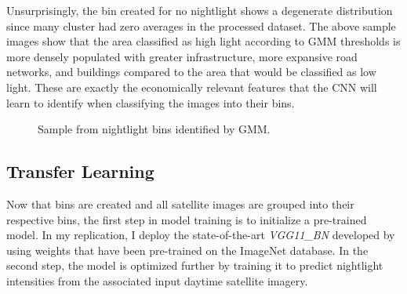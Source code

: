 \documentclass[11pt, a4paper, leqno]{article}
\begin{document}
\noindent Unsurprisingly, the bin created for no nightlight shows a degenerate distribution since many cluster had zero averages in the processed dataset. The above sample images show that the area classified as high light according to GMM thresholds is more densely populated with greater infrastructure, more expansive road networks, and buildings compared to the area that would be classified as low light. These are exactly the economically relevant features that the CNN will learn to identify when classifying the images into their bins. 

\begin{figure}%
    \centering
    \qquad
    \caption{Sample from nightlight bins identified by GMM.}%
    \label{fig:example}%
\end{figure}

\subsection{Transfer Learning}

\noindent Now that bins are created and all satellite images are grouped into their respective bins, the first step in model training is to initialize a pre-trained model. In my replication, I deploy the state-of-the-art \textit{VGG11\_BN} developed by \citet{simonyan2014very} using weights that have been pre-trained on the ImageNet database. In the second step, the model is optimized further by training it to predict nightlight intensities from the associated input daytime satellite imagery.
\end{document}
